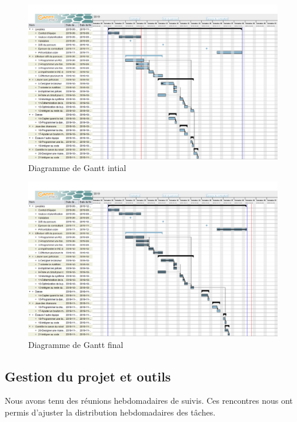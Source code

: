 \begin{figure}[h!]
    \centering
    \includegraphics[width=\linewidth]{img/s1/robuck-2019-09-26}
    \caption{Diagramme de Gantt intial}
    \label{fig:planif-initial}
\end{figure}

\begin{figure}[h!]
    \centering
    \includegraphics[width=\linewidth]{img/s1/robuck-2019-12-06.png}
    \caption{Diagramme de Gantt final}
    \label{fig:planif-final}
\end{figure}

\clearpage

\subsection{Gestion du projet et outils}

Nous avons tenu des réunions hebdomadaires de suivis.
Ces rencontres nous ont permis d'ajuster la distribution hebdomadaires des tâches.


